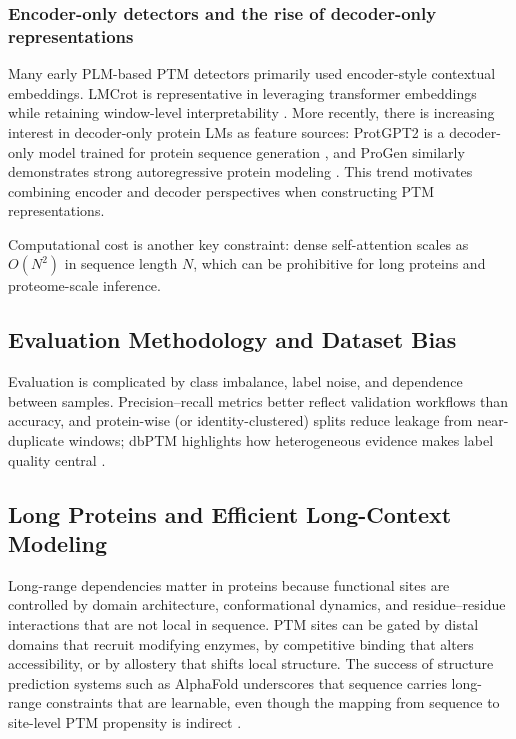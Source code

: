 \documentclass[conference]{IEEEtran}
\begin{document}

\subsubsection{Encoder-only detectors and the rise of decoder-only representations}
Many early PLM-based PTM detectors primarily used encoder-style contextual embeddings. LMCrot is representative in leveraging transformer embeddings while retaining window-level interpretability \cite{pratyush2024lmcrot}. More recently, there is increasing interest in decoder-only protein LMs as feature sources: ProtGPT2 is a decoder-only model trained for protein sequence generation \cite{ferruz2022protgpt2}, and ProGen similarly demonstrates strong autoregressive protein modeling \cite{madani2020progen}. This trend motivates combining encoder and decoder perspectives when constructing PTM representations.

Computational cost is another key constraint: dense self-attention scales as $O(N^2)$ in sequence length $N$, which can be prohibitive for long proteins and proteome-scale inference.

\subsection{Evaluation Methodology and Dataset Bias}
Evaluation is complicated by class imbalance, label noise, and dependence between samples. Precision--recall metrics better reflect validation workflows than accuracy, and protein-wise (or identity-clustered) splits reduce leakage from near-duplicate windows; dbPTM highlights how heterogeneous evidence makes label quality central \cite{li2022dbptm}.


\subsection{Long Proteins and Efficient Long-Context Modeling}
Long-range dependencies matter in proteins because functional sites are controlled by domain architecture, conformational dynamics, and residue--residue interactions that are not local in sequence. PTM sites can be gated by distal domains that recruit modifying enzymes, by competitive binding that alters accessibility, or by allostery that shifts local structure. The success of structure prediction systems such as AlphaFold underscores that sequence carries long-range constraints that are learnable, even though the mapping from sequence to site-level PTM propensity is indirect \cite{jumper2021highly}.
\end{document}
